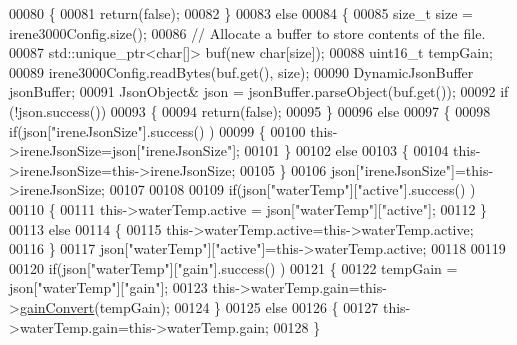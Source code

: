 \begin{DoxyCode}
00080     \{
00081         \textcolor{keywordflow}{return}(\textcolor{keyword}{false});
00082     \}
00083     \textcolor{keywordflow}{else}
00084     \{
00085         \textcolor{keywordtype}{size\_t} size = irene3000Config.size();
00086         \textcolor{comment}{// Allocate a buffer to store contents of the file.}
00087         std::unique\_ptr<char[]> buf(\textcolor{keyword}{new} \textcolor{keywordtype}{char}[size]);
00088             uint16\_t tempGain;
00089         irene3000Config.readBytes(buf.get(), size);
00090         DynamicJsonBuffer jsonBuffer;
00091         JsonObject& json = jsonBuffer.parseObject(buf.get());
00092         \textcolor{keywordflow}{if} (!json.success()) 
00093         \{
00094               \textcolor{keywordflow}{return}(\textcolor{keyword}{false});
00095         \} 
00096         \textcolor{keywordflow}{else}
00097         \{   
00098             \textcolor{keywordflow}{if}(json[\textcolor{stringliteral}{"ireneJsonSize"}].success() )
00099             \{
00100                 this->ireneJsonSize=json[\textcolor{stringliteral}{"ireneJsonSize"}];
00101             \}
00102             \textcolor{keywordflow}{else}
00103             \{
00104                 this->ireneJsonSize=this->ireneJsonSize;
00105             \}
00106             json[\textcolor{stringliteral}{"ireneJsonSize"}]=this->ireneJsonSize;
00107 
00108             
00109             \textcolor{keywordflow}{if}(json[\textcolor{stringliteral}{"waterTemp"}][\textcolor{stringliteral}{"active"}].success() )
00110             \{           
00111                 this->waterTemp.active = json[\textcolor{stringliteral}{"waterTemp"}][\textcolor{stringliteral}{"active"}]; 
00112             \}
00113             \textcolor{keywordflow}{else}
00114             \{
00115                 this->waterTemp.active=this->waterTemp.active;
00116             \}
00117             json[\textcolor{stringliteral}{"waterTemp"}][\textcolor{stringliteral}{"active"}]=this->waterTemp.active;
00118 
00119             
00120             \textcolor{keywordflow}{if}(json[\textcolor{stringliteral}{"waterTemp"}][\textcolor{stringliteral}{"gain"}].success() )
00121             \{           
00122                 tempGain = json[\textcolor{stringliteral}{"waterTemp"}][\textcolor{stringliteral}{"gain"}]; 
00123                 this->waterTemp.gain=this->\hyperlink{class_irene3000_abcad62d1201a59f8dd3ba87048002728}{gainConvert}(tempGain);
00124             \}
00125             \textcolor{keywordflow}{else}
00126             \{
00127                 this->waterTemp.gain=this->waterTemp.gain;
00128             \}

\end{DoxyCode}
